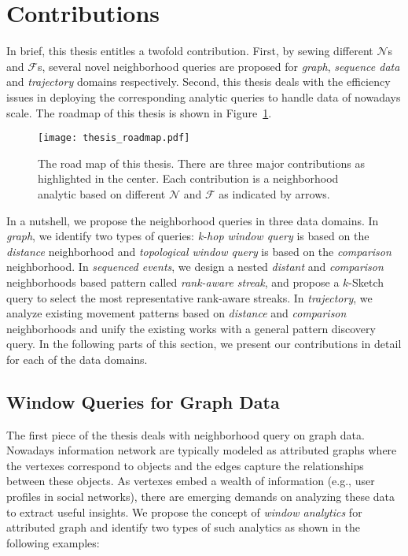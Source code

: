 \section{Contributions}
In brief, this thesis entitles a twofold contribution.
First, by sewing different $\mathcal{N}$s and $\mathcal{F}$s, 
several novel neighborhood queries are proposed for 
\emph{graph}, \emph{sequence data} and \emph{trajectory} domains respectively. 
Second, this thesis
deals with the efficiency issues in deploying the corresponding analytic queries to
handle data of nowadays scale.
The roadmap of this thesis is shown in Figure~\ref{fig:thesis_roadmap}.
\begin{figure}[h]
\centering
\texttt{[image: thesis\_roadmap.pdf]}
\caption{The road map of this thesis. There are three major contributions as highlighted in the center. Each contribution
is a neighborhood analytic based on different $\mathcal{N}$ and $\mathcal{F}$ as indicated by arrows.} 
\label{fig:thesis_roadmap}
\end{figure}

In a nutshell, we propose the neighborhood queries in three data domains. 
In \emph{graph}, we identify two types of queries: \emph{k-hop window query} is based on the \emph{distance} neighborhood
and \emph{topological window query} is based on the \emph{comparison} neighborhood. 
In \emph{sequenced events}, we design a nested \emph{distant} and \emph{comparison} neighborhoods based pattern called \emph{rank-aware streak}, and propose a $k$-Sketch query to select the most representative rank-aware streaks.
In \emph{trajectory}, we analyze existing movement patterns based
on \emph{distance} and \emph{comparison} neighborhoods and unify
the existing works with a general pattern discovery query. In the following parts of this section, we present our contributions in detail for each of the data domains.


\subsection{Window Queries for Graph Data}
The first piece of the thesis deals with neighborhood query
on graph data. Nowadays information network are typically
modeled as attributed graphs where the 
vertexes correspond to objects and the edges capture the
relationships between these objects. As vertexes embed a wealth
of information (e.g., user profiles in social networks), there are 
emerging demands on analyzing these data to extract useful insights. 
We propose the concept of \emph{window analytics} 
for attributed graph and identify two types of such analytics as shown in the following examples:

